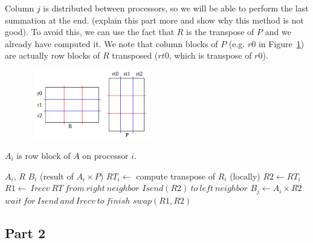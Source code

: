 Column $j$ is distributed between processors, so we will be able to perform the last summation at the end. (explain this part more and show why this method is not good). To avoid this, we can use the fact that $R$ is the transpose of $P$ and we already have computed it. We note that column blocks of $P$ (e.g. $r0$ in Figure~\ref{fig:part1c}) are actually row blocks of $R$ transposed ($rt0$, which is transpose of $r0$).

\begin{figure}[tbh]
 \centering
 \includegraphics[width=5.5cm,height=3cm]{./figures/part1c.pdf}
 \caption{}
 \label{fig:part1c}
\end{figure}

$A_i$ is row block of $A$ on processor $i$.

\begin{algorithm}[H] 
  \caption{Part 1: $B_i = A_i \times P$} \label{alg:part1} 
  \begin{algorithmic}[1]
    \Require $A_i$, $R$
    \Ensure  $B_i$ (result of $A_i \times P$)
    \State $RT_i \leftarrow$ compute transpose of $R_i$ (locally)
    \State $R2 \leftarrow RT_i$
      \State $R1 \leftarrow\ Irecv\ RT\ from\ right\ neighbor$
      \State $Isend(R2)\ to\ left\ neighbor$
      \State $B_j \leftarrow A_i \times R2$
      \State $wait\ for\ Isend\ and\ Irecv\ to\ finish$
      \State $swap(R1,R2)$
    \EndFor
  \end{algorithmic}
\end{algorithm}



\subsection{Part 2}
